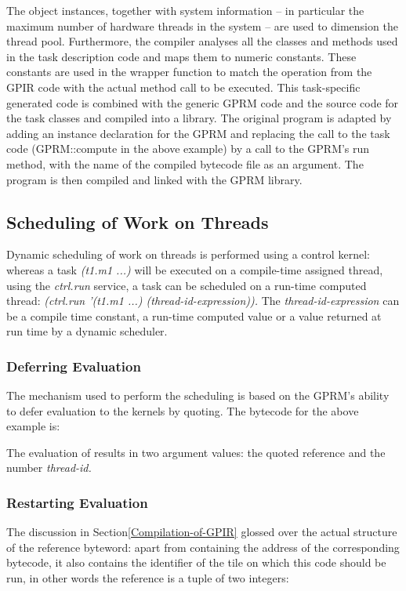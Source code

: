\documentclass[copyright,creativecommons]{eptcs}
\begin{document}
The object instances, together with system information -- in particular
the maximum number of hardware threads in the system -- are used to
dimension the thread pool. Furthermore, the compiler analyses all
the classes and methods used in the task description code and maps
them to numeric constants. These constants are used in the wrapper
function to match the operation from the GPIR code with the actual
method call to be executed. This task-specific generated code is combined
with the generic GPRM code and the source code for the task classes
and compiled into a library. The original program is adapted by adding
an instance declaration for the GPRM and replacing the call to the
task code (GPRM::compute in the above example) by a call to the GPRM's
run method, with the name of the compiled bytecode file as an argument.
The program is then compiled and linked with the GPRM library. 


\subsection{Scheduling of Work on Threads }

Dynamic scheduling of work on threads is performed using a control
kernel: whereas a task \emph{(t1.m1 ...) }will be executed on a compile-time
assigned thread, using the \emph{ctrl.run} service, a task can be
scheduled on a run-time computed thread: \emph{(ctrl.run '(t1.m1 ...)
(thread-id-expression)).} The \emph{thread-id-expression }can be a
compile time constant, a run-time computed value or a value returned
at run time by a dynamic scheduler.


\subsubsection{Deferring Evaluation}

The mechanism used to perform the scheduling is based on the GPRM's
ability to defer evaluation to the kernels by quoting. The bytecode
for the above example is:



The evaluation of  results in two argument values: the quoted
reference  and the number \emph{thread-id. }


\subsubsection{Restarting Evaluation}

The discussion in Section\ref{Compilation-of-GPIR} glossed over the
actual structure of the reference byteword: apart from containing
the address of the corresponding bytecode, it also contains the identifier
of the tile on which this code should be run, in other words the reference
is a tuple of two integers: 
\end{document}
